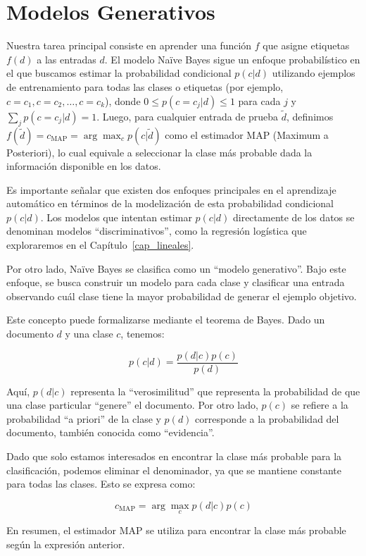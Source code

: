 \section{Modelos Generativos}

Nuestra tarea principal consiste en aprender una función $f$ que asigne etiquetas $f(d)$ a las entradas $d$. El modelo Naïve Bayes sigue un enfoque probabilístico en el que buscamos estimar la probabilidad condicional $p(c|d)$ utilizando ejemplos de entrenamiento para todas las clases o etiquetas (por ejemplo, $c=c_1, c=c_2, \ldots, c=c_k$), donde $0 \leq p(c=c_j|d) \leq 1$ para cada $j$ y $\sum_j p(c=c_j|d)=1$. Luego, para cualquier entrada de prueba $\tilde{d}$, definimos $f(\tilde{d}) = c_{\text{MAP}} = \arg \max_c p(c|\tilde{d})$ como el estimador MAP (Maximum a Posteriori), lo cual equivale a seleccionar la clase más probable dada la información disponible en los datos.

Es importante señalar que existen dos enfoques principales en el aprendizaje automático en términos de la modelización de esta probabilidad condicional $p(c|d)$. Los modelos que intentan estimar $p(c|d)$ directamente de los datos se denominan modelos ``discriminativos'', como la regresión logística que exploraremos en el Capítulo~\ref{cap_lineales}.

Por otro lado, Naïve Bayes se clasifica como un ``modelo generativo''. Bajo este enfoque, se busca construir un modelo para cada clase y clasificar una entrada observando cuál clase tiene la mayor probabilidad de generar el ejemplo objetivo.

Este concepto puede formalizarse mediante el teorema de Bayes. Dado un documento $d$ y una clase $c$, tenemos:

\[
p(c | d) = \frac{p(d | c)p(c)}{p(d)}
\]

Aquí, $p(d | c)$ representa la ``verosimilitud'' que representa la probabilidad de que una clase particular ``genere'' el documento. Por otro lado, $p(c)$ se refiere a la probabilidad ``a priori'' de la clase y $p(d)$ corresponde a la probabilidad del documento, también conocida como ``evidencia''.

Dado que solo estamos interesados en encontrar la clase más probable para la clasificación, podemos eliminar el denominador, ya que se mantiene constante para todas las clases. Esto se expresa como:

\[
c_{\text{MAP}}  = \arg\max_{c} p(d | c)p(c)
\]

En resumen, el estimador MAP se utiliza para encontrar la clase más probable según la expresión anterior.

